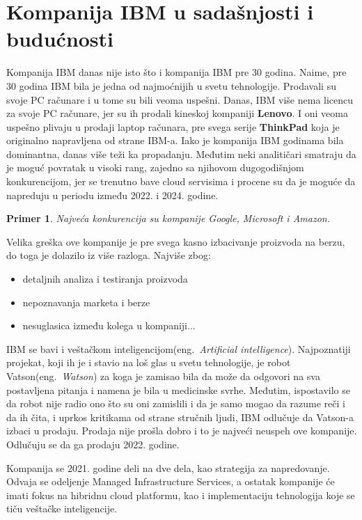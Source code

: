\documentclass[a4paper]{article}
\newtheorem{primer}{Primer}[section]
\begin{document}
\section{Kompanija IBM u sadašnjosti i budućnosti}
Kompanija IBM danas nije isto što i kompanija IBM pre 30 godina. Naime, pre 30 godina IBM bila je jedna od najmoćnijih u svetu tehnologije. Prodavali su svoje PC računare i u tome su bili veoma uspešni.
Danas, IBM više nema licencu za svoje PC računare, jer su ih prodali kineskoj kompaniji \textbf{Lenovo}\cite{lit1}. I oni veoma uspešno plivaju u prodaji laptop računara, pre svega serije \textbf{ThinkPad} koja je originalno napravljena od strane IBM-a. Iako je kompanija IBM godinama bila dominantna, danas više teži ka propadanju. Međutim neki analitičari smatraju da je moguć povratak u visoki rang, zajedno sa njihovom dugogodišnjom konkurencijom, jer se trenutno bave cloud servisima i procene su da je moguće da napreduju u periodu između 2022. i 2024. godine.

\begin{primer}
Najveća konkurencija su kompanije Google, Microsoft i Amazon.
\end{primer}

Velika greška ove kompanije je pre svega kasno izbacivanje proizvoda na berzu, do toga je dolazilo iz više razloga. Najviše zbog:

\begin{itemize}
\item detaljnih analiza i testiranja proizvoda
\item nepoznavanja marketa i berze
\item nesuglasica između kolega u kompaniji...
\end{itemize}

IBM se bavi i veštačkom inteligencijom(eng.~{\em Artificial intelligence}). Najpoznatiji projekat, koji ih je i stavio na loš glas u svetu tehnologije, je robot Vatson(eng.~{\em Watson}) za koga je zamisao bila da može da odgovori na sva postavljena pitanja i namena je bila u medicinske svrhe. Međutim, ispostavilo se da robot nije radio ono što su oni zamislili i da je samo mogao da razume reči i da ih čita, i uprkos kritikama od strane stručnih ljudi, IBM odlučuje da Vatson-a izbaci u prodaju. Prodaja nije prošla dobro i to je najveći neuspeh ove kompanije. Odlučuju se da ga prodaju 2022. godine.

Kompanija se 2021. godine deli na dve dela, kao strategija za napredovanje. Odvaja se odeljenje Managed Infrastructure Services, a ostatak kompanije će imati fokus na hibridnu cloud platformu, kao i implementaciju tehnologija koje se tiču veštačke inteligencije.
\end{document}
